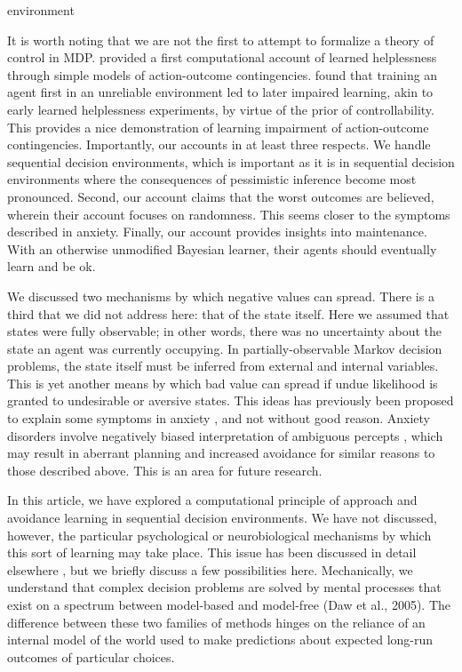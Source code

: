 environment\documentclass[11pt]{article} %
\begin{document}
It is worth noting that we are not the first to attempt to formalize a theory
of control in MDP. \cite{HuysDayan2009} provided a first computational account
of learned helplessness through simple models of action-outcome contingencies.
\cite{HuysDayan2009} found that training an agent first in an unreliable environment
led to later impaired learning, akin to early learned helplessness experiments,
by virtue of the prior of controllability. This provides a nice demonstration
of learning impairment of action-outcome contingencies. Importantly, our accounts
in at least three respects. We handle sequential decision environments, which is
important as it is in sequential decision environments where the consequences
of pessimistic inference become most pronounced. Second, our account claims
that the worst outcomes are believed, wherein their account focuses on randomness.
This seems closer to the symptoms described in anxiety. Finally, our account
provides insights into maintenance. With an otherwise unmodified Bayesian learner,
their agents should eventually learn and be ok.

We discussed two mechanisms by which negative values can spread. There is a third
that we did not address here: that of the state itself. Here we assumed that states
were fully observable; in other words, there was no uncertainty about the state
an agent was currently occupying. In partially-observable Markov decision problems,
the state itself must be inferred from external and internal variables. This is
yet another means by which bad value can spread if undue likelihood is granted
to undesirable or aversive states. This ideas has previously been proposed to
explain some symptoms in anxiety \citep{Paulus2012}, and not without good reason.
Anxiety disorders involve negatively biased interpretation of ambiguous percepts
\citep{Hartley2012}, which may result in aberrant planning and increased avoidance
for similar reasons to those described above. This is an area for future research.

In this article, we have explored a computational principle of approach and
avoidance learning in sequential decision environments. We have not discussed,
however, the particular psychological or neurobiological mechanisms by which this
sort of learning may take place. This issue has been discussed in detail elsewhere
\citep{Bishop2018}, but we briefly discuss a few possibilities here. Mechanically,
we understand that complex decision problems are solved by mental processes that
exist on a spectrum between model-based and model-free (Daw et al., 2005). The
difference between these two families of methods hinges on the reliance of an
internal model of the world used to make predictions about expected long-run
outcomes of particular choices.
\end{document}
